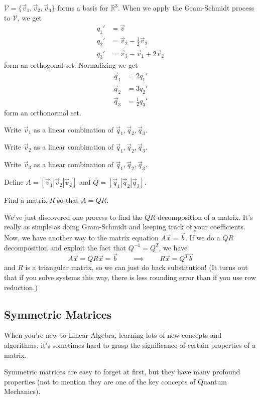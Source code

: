 \documentclass{problemset}
\newcommand{\R}{\mathbb{R}}
\begin{document}
	\question
	$\mathcal V=\{\vec v_1,\vec v_2,\vec v_3\}$ forms a basis for $\R^3$.
	When we apply the Gram-Schmidt process to $\mathcal V$, we get
	\[
		\begin{array}{rl}
			q_1' &=\vec v\\
			q_2' &= \vec v_2-\frac{1}{2}\vec v_2\\
			q_3' &= \vec v_3-\vec v_1+2\vec v_2
		\end{array}
	\]
	form an orthogonal set.  Normalizing we get
	\[
		\begin{array}{rl}
			\vec q_1 &= 2q_1'\\
			\vec q_2 &= 3q_2'\\
			\vec q_3 &=\frac{1}{2}q_3'
		\end{array}
	\]
	form an orthonormal set.
	\begin{parts}
		\item Write $\vec v_1$ as a linear combination of $\vec q_1,\vec q_2,\vec q_3$.
		\item Write $\vec v_2$ as a linear combination of $\vec q_1,\vec q_2,\vec q_3$.
		\item Write $\vec v_3$ as a linear combination of $\vec q_1,\vec q_2,\vec q_3$.
	\end{parts}
	Define $A=[\vec v_1|\vec v_2|\vec v_2]$ and $Q=[\vec q_1|\vec q_2|\vec q_3]$.
	\begin{parts}[resume]
		\item Find a matrix $R$ so that $A=QR$.
	\end{parts}
	
	We've just discovered one process to find the $QR$ decomposition of a matrix.
	It's really as simple as doing Gram-Schmidt and keeping track of your coefficients.
	Now, we have another way to the matrix equation $A\vec x=\vec b$.  If we do a $QR$
	decomposition and exploit the fact that $Q^{-1}=Q^T$, we have
	\[
		A\vec x=QR\vec x=\vec b\qquad\implies\qquad R\vec x=Q^T\vec b
	\]
	and $R$ is a triangular matrix, so we can just do back substitution! (It turns
	out that if you solve systems this way, there is less rounding error than if you
	use row reduction.)

\subsection*{Symmetric Matrices}
	When you're new to Linear Algebra, learning lots of new concepts and algorithms,
	it's sometimes hard to grasp the significance of certain properties of a matrix.

	Symmetric matrices are easy to forget at first, but they have many profound 
	properties (not to mention they are one of the key concepts of Quantum Mechanics).
\end{document}
